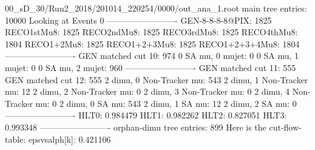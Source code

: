 00_sD_30/Run2_2018/201014_220254/0000/out_ana_1.root
main tree entries: 10000
Looking at Events 0
-------------------------
GEN-8-8-8-8@PIX: 1825
RECO1stMu8: 1825
RECO2ndMu8: 1825
RECO3rdMu8: 1825
RECO4thMu8: 1804
RECO1+2Mu8: 1825
RECO1+2+3Mu8: 1825
RECO1+2+3+4Mu8: 1804
-------------------------
GEN matched cut 10: 974
0 SA mu, 0 mujet: 0
0 SA mu, 1 mujet: 0
0 SA mu, 2 mujet: 960
-------------------------
GEN matched cut 11: 555
GEN matched cut 12: 555
2 dimu, 0 Non-Tracker mu: 543
2 dimu, 1 Non-Tracker mu: 12
2 dimu, 2 Non-Tracker mu: 0
2 dimu, 3 Non-Tracker mu: 0
2 dimu, 4 Non-Tracker mu: 0
2 dimu, 0 SA mu: 543
2 dimu, 1 SA mu: 12
2 dimu, 2 SA mu: 0
-------------------------
HLT0: 0.984479
HLT1: 0.982262
HLT2: 0.827051
HLT3: 0.993348
-------------------------
orphan-dimu tree entries: 899
Here is the cut-flow-table:
epsvsalph[k]: 0.421106
        

